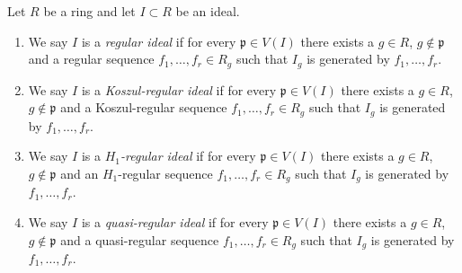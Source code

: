 \begin{definition}
\label{definition-regular-ideal}
Let $R$ be a ring and let $I \subset R$ be an ideal.
\begin{enumerate}
\item We say $I$ is a {\it regular ideal} if for every
$\mathfrak p \in V(I)$ there exists a $g \in R$, $g \not \in \mathfrak p$
and a regular sequence $f_1, \ldots, f_r \in R_g$ such that $I_g$
is generated by $f_1, \ldots, f_r$.
\item We say $I$ is a {\it Koszul-regular ideal} if for every
$\mathfrak p \in V(I)$ there exists a $g \in R$, $g \not \in \mathfrak p$
and a Koszul-regular sequence $f_1, \ldots, f_r \in R_g$ such that $I_g$
is generated by $f_1, \ldots, f_r$.
\item We say $I$ is a {\it $H_1$-regular ideal} if for every
$\mathfrak p \in V(I)$ there exists a $g \in R$, $g \not \in \mathfrak p$
and an $H_1$-regular sequence $f_1, \ldots, f_r \in R_g$ such that $I_g$
is generated by $f_1, \ldots, f_r$.
\item We say $I$ is a {\it quasi-regular ideal} if for every
$\mathfrak p \in V(I)$ there exists a $g \in R$, $g \not \in \mathfrak p$
and a quasi-regular sequence $f_1, \ldots, f_r \in R_g$ such that $I_g$
is generated by $f_1, \ldots, f_r$.
\end{enumerate}
\end{definition}